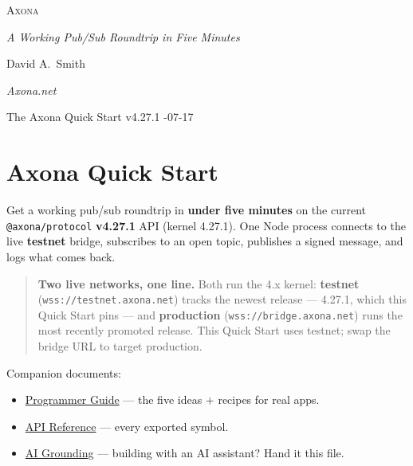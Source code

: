 \documentclass[
  nobib]{tufte-handout}
\author{}
\date{}
\providecommand{\tightlist}{%
  \setlength{\itemsep}{0pt}\setlength{\parskip}{0pt}}
\begin{document}
\thispagestyle{empty}
\null\vfill
\begin{center}
{\fontsize{48}{52}\selectfont \textsc{Axona}\par}
\vspace{0.6em}
{\Large\itshape A Working Pub/Sub Roundtrip in Five Minutes\par}
\vspace{4em}
{\large David A.~Smith\par}
{\itshape\small Axona.net\par}
\vspace{2em}
{\small The Axona Quick Start \quad v4.27.1 -07-17\par}
\end{center}
\vfill
\null
\newpage
\pagestyle{ndhtplain}
\thispagestyle{ndhtplain}
\setcounter{page}{1}

\section{Axona Quick Start}\label{axona-quick-start}

Get a working pub/sub roundtrip in \textbf{under five minutes} on the
current \texttt{@axona/protocol} \textbf{v4.27.1} API (kernel 4.27.1).
One Node process connects to the live \textbf{testnet} bridge,
subscribes to an open topic, publishes a signed message, and logs what
comes back.

\begin{quote}
\textbf{Two live networks, one line.} Both run the 4.x kernel:
\textbf{testnet} (\texttt{wss://testnet.axona.net}) tracks the newest
release --- 4.27.1, which this Quick Start pins --- and
\textbf{production} (\texttt{wss://bridge.axona.net}) runs the most
recently promoted release. This Quick Start uses testnet; swap the
bridge URL to target production.
\end{quote}

Companion documents:

\begin{itemize}
\tightlist
\item
  \href{Axona-Programmer-Guide-v4.27.1.md}{Programmer Guide} --- the
  five ideas + recipes for real apps.
\item
  \href{Axona-API-Reference-v4.27.1.md}{API Reference} --- every
  exported symbol.
\item
  \href{Axona-AI-Grounding-v4.27.1.md}{AI Grounding} --- building with
  an AI assistant? Hand it this file.
\end{itemize}
\end{document}

